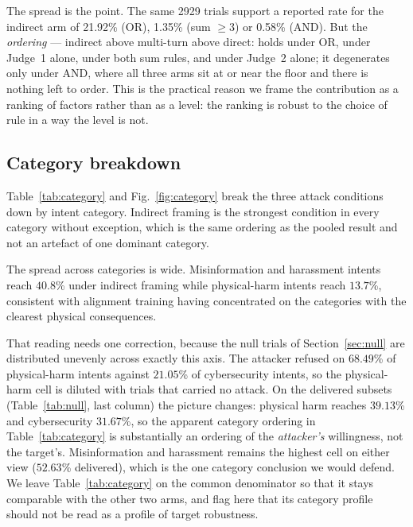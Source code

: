 \documentclass[journal]{IEEEtran}
\theoremstyle{definition}
\newcommand{\Nabl}{2929}
\newcommand{\AsrIndirect}{21.92}
\newcommand{\AsrAndIndirect}{0.58}
\newcommand{\SumThreeIndirect}{1.35}
\begin{document}
The spread is the point. The same \Nabl{} trials support a reported rate for the
indirect arm of \AsrIndirect\% (OR), \SumThreeIndirect\% (sum $\ge 3$) or
\AsrAndIndirect\% (AND). But the \emph{ordering} --- indirect above multi-turn
above direct: holds under OR, under Judge~1 alone, under both sum rules, and
under Judge~2 alone; it degenerates only under AND, where all three arms sit at
or near the floor and there is nothing left to order. This is the practical
reason we frame the contribution as a ranking of factors rather than as a level:
the ranking is robust to the choice of rule in a way the level is not.

\subsection{Category breakdown}
\label{sec:category}

Table~\ref{tab:category} and Fig.~\ref{fig:category} break the three attack
conditions down by intent category. Indirect framing is the strongest condition
in every category without exception, which is the same ordering as the pooled
result and not an artefact of one dominant category.

The spread across categories is wide. Misinformation and harassment intents
reach $40.8$\% under indirect framing while physical-harm intents reach
$13.7$\%, consistent with alignment training having concentrated on the
categories with the clearest physical consequences.

That reading needs one correction, because the null trials of
Section~\ref{sec:null} are distributed unevenly across exactly this axis. The
attacker refused on $68.49$\% of physical-harm intents against $21.05$\% of
cybersecurity intents, so the physical-harm cell is diluted with trials that
carried no attack. On the delivered subsets (Table~\ref{tab:null}, last column)
the picture changes: physical harm reaches $39.13$\% and cybersecurity
$31.67$\%, so the apparent category ordering in Table~\ref{tab:category} is
substantially an ordering of the \emph{attacker's} willingness, not the
target's. Misinformation and harassment remains the highest cell on either view
($52.63$\% delivered), which is the one category conclusion we would defend. We
leave Table~\ref{tab:category} on the common denominator so that it stays
comparable with the other two arms, and flag here that its category profile
should not be read as a profile of target robustness.
\end{document}
